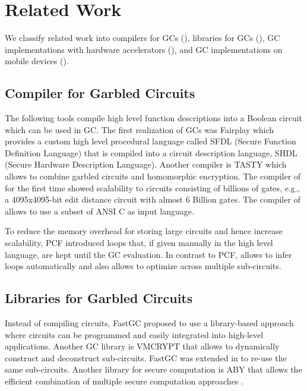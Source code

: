 \chapter{Related Work}
We classify related work into compilers for GCs (), libraries for GCs (), GC implementations with hardware accelerators (), and GC implementations on mobile devices ().

\section{Compiler for Garbled Circuits}
The following tools compile high level function descriptions into a Boolean circuit which can be used in GC.
The first realization of GCs was Fairplay \cite{malkhi2004fairplay} which provides a custom high level procedural language called SFDL (Secure Function Definition Language) that is compiled into a circuit description language, SHDL (Secure Hardware Description Language).
Another compiler is TASTY \cite{henecka2010tasty} which allows to combine garbled circuits and homomorphic encryption.
The compiler of \cite{kreuter2012billion} for the first time showed scalability to circuits consisting of billions of gates, e.g., a 4095x4095-bit edit distance circuit with almost 6 Billion gates.
The compiler of \cite{franz2014cbmc} allows to use a subset of ANSI C as input language.

To reduce the memory overhead for storing large circuits and hence increase scalability, PCF \cite{kreuter2013pcf} introduced loops that, if given manually in the high level language, are kept until the GC evaluation.
In contrast to PCF, \sys{} allows to infer loops automatically and also allows to optimize across multiple sub-circuits.

\section{Libraries for Garbled Circuits}
Instead of compiling circuits, FastGC \cite{huang2011faster} proposed to use a library-based approach where circuits can be programmed and easily integrated into high-level applications.
Another GC library is VMCRYPT \cite{malka2011vmcrypt} that allows to dynamically construct and deconstruct sub-circuits.
FastGC was extended in \cite{henecka2013faster} to re-use the same sub-circuits.
Another library for secure computation is ABY that allows the efficient combination of multiple secure computation approaches \cite{demmler2015aby}.

